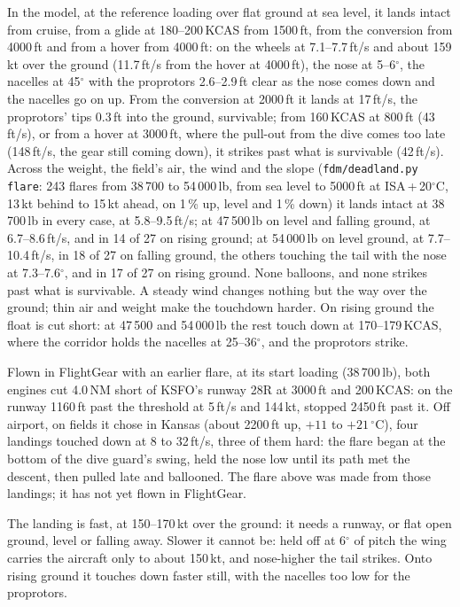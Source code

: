 \documentclass[11pt,a4paper,oneside]{book}
\begin{document}
In the model, at the reference loading over flat ground at sea level, it lands intact from cruise, from a glide at
180--200\,KCAS from 1500\,ft, from the conversion from 4000\,ft and from a hover from 4000\,ft: on the wheels at
7.1--7.7\,ft/s and about 159\,kt over the ground (11.7\,ft/s from the hover at 4000\,ft), the nose at 5--6$^\circ$, the
nacelles at 45$^\circ$ with the proprotors 2.6--2.9\,ft clear as the nose comes down and the nacelles go on up. From
the conversion at 2000\,ft it lands at 17\,ft/s, the proprotors' tips 0.3\,ft into the ground, survivable; from
160\,KCAS at 800\,ft (43\,ft/s), or from a hover at 3000\,ft, where the pull-out from the dive comes too late (148\,ft/s,
the gear still coming down), it strikes past what is survivable (42\,ft/s). Across the weight, the field's air, the wind
and the slope (\texttt{fdm/deadland.py flare}: 243 flares from 38\,700 to 54\,000\,lb, from sea level to 5000\,ft at
ISA\,+\,20$^\circ$C, 13\,kt behind to 15\,kt ahead, on 1\,\% up, level and 1\,\% down) it lands intact at 38\,700\,lb
in every case, at 5.8--9.5\,ft/s; at 47\,500\,lb on level and falling ground, at 6.7--8.6\,ft/s, and in 14 of 27 on
rising ground; at 54\,000\,lb on level ground, at 7.7--10.4\,ft/s, in 18 of 27 on falling ground, the others touching
the tail with the nose at 7.3--7.6$^\circ$, and in 17 of 27 on rising ground. None balloons, and none strikes past
what is survivable. A steady wind changes nothing but the way over the ground; thin air and weight make the
touchdown harder. On rising ground the float is cut short: at 47\,500 and 54\,000\,lb the rest touch down at
170--179\,KCAS, where the corridor holds the nacelles at 25--36$^\circ$, and the proprotors strike.

Flown in FlightGear with an earlier flare, at its start loading (38\,700\,lb), both engines cut 4.0\,NM short of KSFO's
runway 28R at 3000\,ft and 200\,KCAS: on the runway 1160\,ft past the threshold at 5\,ft/s and 144\,kt, stopped 2450\,ft
past it. Off airport, on fields it chose in Kansas (about 2200\,ft up, $+11$ to $+21\,^\circ$C), four landings touched
down at 8 to 32\,ft/s, three of them hard: the flare began at the bottom of the dive guard's swing, held the nose low
until its path met the descent, then pulled late and ballooned. The flare above was made from those landings; it has
not yet flown in FlightGear.
\begin{warning}
The landing is fast, at 150--170\,kt over the ground: it needs a runway, or flat open ground, level or falling away.
Slower it cannot be: held off at 6$^\circ$ of pitch the wing carries the aircraft only to about 150\,kt, and
nose-higher the tail strikes. Onto rising ground it touches down faster still, with the nacelles too low for the
proprotors.
\end{warning}
\end{document}
